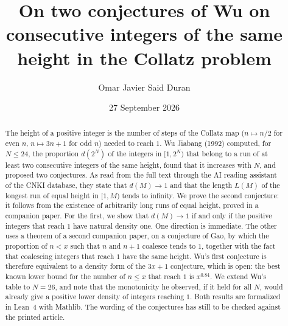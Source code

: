 \documentclass[11pt]{amsart}
\theoremstyle{definition}
\theoremstyle{remark}
\begin{document}
\title[Two conjectures of Wu]{On two conjectures of Wu on consecutive integers of the same height in the Collatz problem}

\author[O. J. Said Duran]{Omar Javier Said Duran}
\address{Independent Researcher}

\date{27 September 2026}

\begin{abstract}
The height of a positive integer is the number of steps of the Collatz map ($n\mapsto n/2$ for even $n$, $n\mapsto 3n+1$ for odd $n$) needed to reach $1$. Wu Jiabang (1992) computed, for $N\le 24$, the proportion $d(2^N)$ of the integers in $[1,2^N)$ that belong to a run of at least two consecutive integers of the same height, found that it increases with $N$, and proposed two conjectures. As read from the full text through the AI reading assistant of the CNKI database, they state that $d(M)\to1$ and that the length $L(M)$ of the longest run of equal height in $[1,M)$ tends to infinity. We prove the second conjecture: it follows from the existence of arbitrarily long runs of equal height, proved in a companion paper. For the first, we show that $d(M)\to1$ if and only if the positive integers that reach $1$ have natural density one. One direction is immediate. The other uses a theorem of a second companion paper, on a conjecture of Gao, by which the proportion of $n<x$ such that $n$ and $n+1$ coalesce tends to $1$, together with the fact that coalescing integers that reach $1$ have the same height. Wu's first conjecture is therefore equivalent to a density form of the $3x+1$ conjecture, which is open: the best known lower bound for the number of $n\le x$ that reach $1$ is $x^{0.84}$. We extend Wu's table to $N=26$, and note that the monotonicity he observed, if it held for all $N$, would already give a positive lower density of integers reaching $1$. Both results are formalized in Lean~4 with Mathlib. The wording of the conjectures has still to be checked against the printed article.
\end{abstract}


\maketitle
\end{document}
